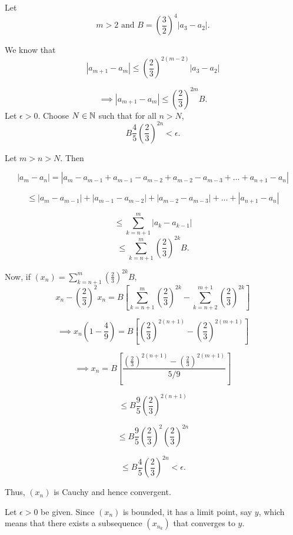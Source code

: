 \documentclass{report}
\begin{document}
\begin{myproof}

  Let $$m>2 \text{ and } B =\left(\frac{3}{2}\right)^{4}\left|a_3 -a_2\right|.$$

We know that  
$$ \left|a_{m+1} - a_m\right| \leq \left(\frac{2}{3}\right)^{2(m-2)} \left|a_3 -a_2\right|$$

$$ \implies \left|a_{m+1} - a_m\right| \leq \left(\frac{2}{3}\right)^{2m}B.$$
Let $\epsilon > 0.$ Choose $N\in\NN$ such that for all $n > N$, $$ B \frac{4}{5}\left(\frac{2}{3}\right)^{2n}< \epsilon.$$

Let $m > n > N.$ Then

$$|a_m - a_n|= |a_m - a_{m-1} + a_{m-1} - a_{m-2}  + a_{m-2} - a_{m-3}+ \dots+ a_{n+1} -  a_{n}| $$

$$\leq |a_m - a_{m-1}| + |a_{m-1} - a_{m-2}|  + 
|a_{m-2} -  a_{m-3}| + \dots + | a_{n+1} -  a_{n}| $$

$$ \leq \sum_{k={n+1}}^{m} |a_k - a_{k-1}|$$
$$ \leq \sum_{k={n+1}}^{m} \left(\frac{2}{3}\right)^{2k}B  .$$


Now, if $(x_n)= \sum_{k={n+1}}^{m} \left(\frac{2}{3}\right)^{2k}B , $ 
$$x_n - \left(\frac{2}{3}\right)^2x_n = B\left[\sum_{k={n+1}}^{m}\left(\frac{2}{3}\right)^{2k} - \sum_{k={n+2}}^{m+1}\left(\frac{2}{3}\right)^{2k}\right]$$

$$\implies x_n\left(1 - \frac{4}{9}\right) = B\left[ \left(\frac{2}{3}\right)^{2(n+1)}- \left(\frac{2}{3}\right)^{2(m+1)}\right] $$

$$\implies x_n = B\left[\frac{\left(\frac{2}{3}\right)^{2(n+1)}- \left(\frac{2}{3}\right)^{2(m+1)}}{5/9}\right] $$

$$\leq B\frac{9}{5}\left(\frac{2}{3}\right)^{2(n+1)}$$

$$\leq B\frac{9}{5}\left(\frac{2}{3}\right)^{2}\left(\frac{2}{3}\right)^{2n}$$

$$\leq B \frac{4}{5}\left(\frac{2}{3}\right)^{2n} < \epsilon.$$


Thus, $(x_n)$ is Cauchy and hence convergent.

    
\end{myproof}

\pagebreak
{}

Let $\epsilon>0$ be given. Since $\left(x_n\right)$ is bounded, it has a limit point, say $y$, which means that there exists a subsequence $\left(x_{n_k}\right)$ that converges to $y$. 
\end{document}
